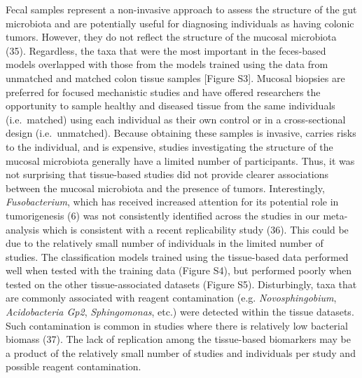 \documentclass[12pt,]{article}
\begin{document}
Fecal samples represent a non-invasive approach to assess the structure
of the gut microbiota and are potentially useful for diagnosing
individuals as having colonic tumors. However, they do not reflect the
structure of the mucosal microbiota (35). Regardless, the taxa that were
the most important in the feces-based models overlapped with those from
the models trained using the data from unmatched and matched colon
tissue samples {[}Figure S3{]}. Mucosal biopsies are preferred for
focused mechanistic studies and have offered researchers the opportunity
to sample healthy and diseased tissue from the same individuals
(i.e.~matched) using each individual as their own control or in a
cross-sectional design (i.e.~unmatched). Because obtaining these samples
is invasive, carries risks to the individual, and is expensive, studies
investigating the structure of the mucosal microbiota generally have a
limited number of participants. Thus, it was not surprising that
tissue-based studies did not provide clearer associations between the
mucosal microbiota and the presence of tumors. Interestingly,
\emph{Fusobacterium}, which has received increased attention for its
potential role in tumorigenesis (6) was not consistently identified
across the studies in our meta-analysis which is consistent with a
recent replicability study (36). This could be due to the relatively
small number of individuals in the limited number of studies. The
classification models trained using the tissue-based data performed well
when tested with the training data (Figure S4), but performed poorly
when tested on the other tissue-associated datasets (Figure S5).
Disturbingly, taxa that are commonly associated with reagent
contamination (e.g. \emph{Novosphingobium}, \emph{Acidobacteria Gp2},
\emph{Sphingomonas}, etc.) were detected within the tissue datasets.
Such contamination is common in studies where there is relatively low
bacterial biomass (37). The lack of replication among the tissue-based
biomarkers may be a product of the relatively small number of studies
and individuals per study and possible reagent contamination.
\end{document}
